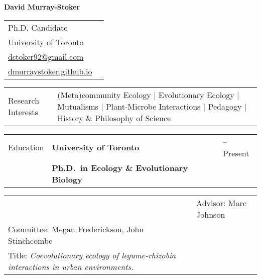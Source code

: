 \documentclass[letterpaper,11pt,oneside]{article}
\begin{document}
\thispagestyle{empty}

\noindent  \LARGE{\textbf{David Murray-Stoker}} 
\smallskip
\normalsize

\noindent \begin{tabular}{@{} p{10cm} >{\raggedleft\arraybackslash}p{8.11cm}}
Ph.D. Candidate \\
University of Toronto & \\
{\href{mailto:dstoker92@gmail.com}{dstoker92@gmail.com}} & \\
{\href{https://dmurraystoker.github.io}{dmurraystoker.github.io}} & \\


\end{tabular}
\vspace{1em}

\noindent\hrulefill 

\bigskip
\bigskip




\noindent \begin{tabular}{@{} p{3cm} >{\raggedright}p{14.2cm}}
\Large{Research Interests} & (Meta)community Ecology | Evolutionary Ecology | Mutualisms | Plant-Microbe Interactions | Pedagogy | History \& Philosophy of Science  \\
\end{tabular}

\bigskip



  

\noindent \begin{tabular}{@{} p{3cm} p{12cm} >{\raggedleft\arraybackslash}p{1.7cm}}
\Large{Education}    & \textbf{University of Toronto} & 2018--Present \\
& \textbf{Ph.D.\ in Ecology \& Evolutionary Biology} & \\
\end{tabular}

\noindent \begin{tabular}{@{} p{3cm} p{13.7cm}}
& \raggedright{Advisor: Marc Johnson} \\
\raggedright{Committee: Megan Frederickson, John Stinchcombe} \\ 
\raggedright{Title: \textit{Coevolutionary ecology of legume-rhizobia interactions in urban environments.}} \\
\end{tabular}
\end{document}
